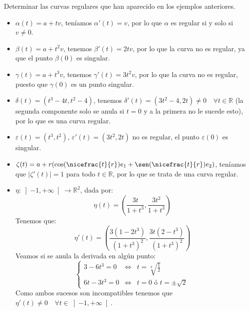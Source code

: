 \begin{ejercicio}
    Determinar las curvas regulares que han aparecido en los ejemplos anteriores.
    \begin{itemize}
        \item $\alpha(t) = a+tv$, teníamos $\alpha'(t) = v$, por lo que $\alpha$ es regular si y solo si $v\neq 0$.
        \item $\beta(t) = a+t^2v$, tenemos $\beta'(t) = 2tv$, por lo que la curva no es regular, ya que el punto $\beta(0)$ es singular.
        \item $\gamma(t) = a+t^3v$, tenemos $\gamma'(t) = 3t^2v$, por lo que la curva no es regular, puesto que $\gamma(0)$ es un punto singular.
        \item $\delta(t) = (t^3-4t, t^2-4)$, tenemos $\delta'(t) = (3t^2-4, 2t)\neq 0 \quad \forall t\in \mathbb{R}$ (la segunda componente solo se anula si $t=0$ y a la primera no le sucede esto), por lo que es una curva regular.
        \item $\varepsilon(t) = (t^3,t^2)$, $\varepsilon'(t) = (3t^2, 2t)$ no es regular, el punto $\varepsilon(0)$ es singular.
        \item $\zeta(t) = a+r(\cos(\nicefrac{t}{r})e_1 + \sen(\nicefrac{t}{r})e_2)$, teníamos que $|\zeta'(t)| = 1$ para todo $t\in \mathbb{R}$, por lo que se trata de una curva regular.
        \item $\eta:\left]-1,+\infty\right[\to \mathbb{R}^2$, dada por:
            \begin{equation*}
                \eta(t) = \left(\frac{3t}{1+t^3}, \frac{3t^2}{1+t^3}\right)
            \end{equation*}
            Tenemos que:
            \begin{equation*}
                \eta'(t) = \left(\frac{3(1-2t^3)}{{(1+t^3)}^{2}}, \frac{3t(2-t^3)}{{(1+t^3)}^{2}}\right)
            \end{equation*}
            Veamos si se anula la derivada en algún punto:
            \begin{equation*}
                \left\{\begin{array}{rcc}
                        3-6t^3 = 0 & \Longleftrightarrow& t = \sqrt[3]{\frac{1}{2}} \\
                        6t-3t^3 = 0 &\Longleftrightarrow& t = 0 \text{\ ó\ } t = \pm \sqrt{2}
                \end{array}\right.
            \end{equation*}
            Como ambos sucesos son incompatibles tenemos que $\eta'(t) \neq 0\quad \forall t\in \left]-1,+\infty\right[$.
    \end{itemize}
\end{ejercicio}

